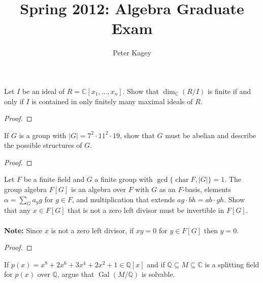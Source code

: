 \documentclass{article}
\newenvironment{problem}[2][Problem]{\begin{trivlist}
\item[\hskip \labelsep {\bfseries #1}\hskip \labelsep {\bfseries #2.}]}{\end{trivlist}}
\newcommand{\Q}{\mathbb Q}
\newcommand{\C}{\mathbb C}
\newcommand{\set}[1]{\{#1\}}
\newcommand{\Gal}{\operatorname{Gal}}
\begin{document}
\title{Spring 2012: Algebra Graduate Exam}
\author{Peter Kagey}

\maketitle

\begin{problem}{1}
  Let $I$ be an ideal of $R = \C[x_1, \hdots, x_n]$. Show that $\dim_\C(R/I)$ is finite if and only if $I$ is contained in only finitely many maximal ideals of $R$.
\end{problem}

\begin{proof}
\end{proof}
\pagebreak

\begin{problem}{2}
  If $G$ is a group with $|G| = 7^2 \cdot 11^2 \cdot 19$, show that $G$ must be abelian and describe the possible structures of $G$.
\end{problem}

\begin{proof}
\end{proof}
\pagebreak

\begin{problem}{3}
  Let $F$ be a finite field and $G$ a finite group with
  $\gcd\set{\operatorname{char} F, |G|} = 1.$ The group algebra $F[G]$ is an
  algebra over $F$ with $G$ as an $F$-basis, elements $\alpha = \sum_G a_gg$ for
  $g \in F$, and multiplication that extends $ag \cdot bh = ab \cdot gh$.
  Show that any $x \in F[G]$ that is not a zero left divisor must be invertible
  in $F[G]$.
  \\~\\
  \textbf{Note:} Since $x$ is not a zero left divisor, if $xy = 0$ for
  $y \in F[G]$ then $y=0$.
\end{problem}

\begin{proof}
\end{proof}
\pagebreak

\begin{problem}{4}
  If $p(x) = x^8 + 2x^6 + 3x^4 + 2x^2 + 1 \in \Q[x]$ and if
  $\Q \subseteq M \subseteq \C$ is a splitting field for $p(x)$ over $\Q$,
  argue that $\Gal(M/\Q)$ is solvable.
\end{problem}
\end{document}
